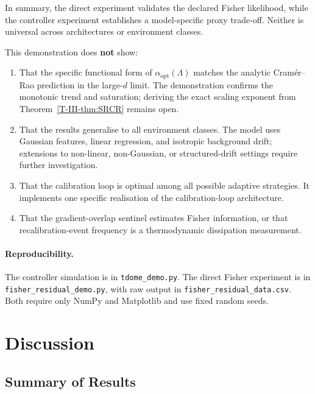 \documentclass[12pt,a4paper,openany]{book}
\begin{document}
\noindent
In summary, the direct experiment validates the declared Fisher
likelihood, while the controller experiment establishes a model-specific
proxy trade-off.  Neither is universal across architectures or
environment classes.

\medskip
This demonstration does \textbf{not} show:
\begin{enumerate}
\item That the specific functional form of
  $\alpha_{\mathrm{opt}}(\Lambda)$ matches the analytic
  Cram\'{e}r--Rao prediction in the
  large-$d$ limit.  The demonstration confirms the
  monotonic trend and saturation; deriving the exact
  scaling exponent from Theorem~\ref{T-III-thm:SRCR}
  remains open.
\item That the results generalise to all environment
  classes.  The model uses Gaussian features, linear
  regression, and isotropic background drift; extensions
  to non-linear, non-Gaussian, or structured-drift
  settings require further investigation.
\item That the calibration loop is optimal among all
  possible adaptive strategies.  It implements one
  specific realisation of the calibration-loop
  architecture.
\item That the gradient-overlap sentinel estimates Fisher information,
  or that recalibration-event frequency is a thermodynamic dissipation
  measurement.
\end{enumerate}

\paragraph{Reproducibility.}
\begin{sloppypar}
The controller simulation is in \texttt{tdome\_demo.py}.  The direct
Fisher experiment is in \texttt{fisher\_residual\_demo.py}, with raw
output in \texttt{fisher\_residual\_data.csv}.  Both require only NumPy
and Matplotlib and use fixed random seeds.
\end{sloppypar}

\section{Discussion}
\label{T-III-sec:discussion}

\subsection{Summary of Results}
\label{T-III-subsec:summary}
\end{document}
